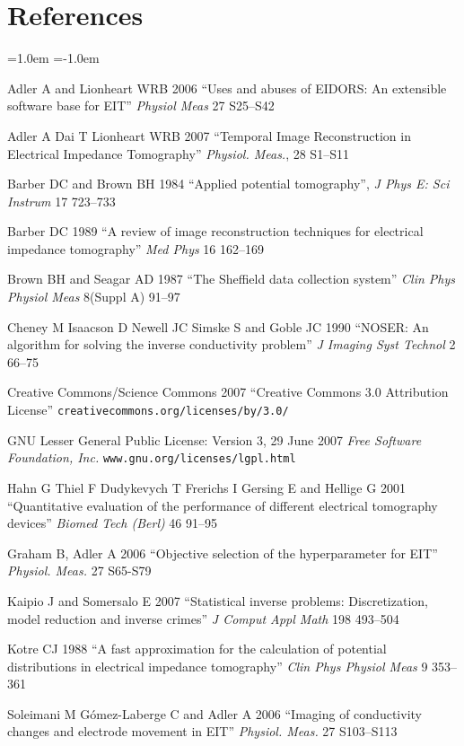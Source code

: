 \documentclass[letterpaper,twocolumn,11pt]{article}
\begin{document}
\section*{References}

\begin{list}{}
  {\leftmargin=1.0em \itemindent=-1.0em
    \baselineskip
    \baselineskip}
\item[]
Adler A and Lionheart WRB 2006
``Uses and abuses of EIDORS: An extensible software base for EIT''
{\em Physiol Meas}
27 S25--S42

\item[]
Adler A Dai T Lionheart WRB 2007
``Temporal Image Reconstruction in Electrical Impedance Tomography''
{\em Physiol. Meas.}, 28 S1--S11


\item[]
Barber DC and Brown BH 1984
``Applied potential tomography'', 
{\em J Phys E: Sci Instrum}
 17 723--733

\item[]
Barber DC 1989
``A review of image reconstruction techniques for electrical
 impedance tomography''
{\em Med Phys}
16 162--169

\item[]
Brown BH and Seagar AD 1987 
``The Sheffield data collection system''
{\em Clin Phys Physiol Meas}
 8(Suppl A) 91--97

\item[]
Cheney M Isaacson D Newell JC Simske S and Goble JC 1990
``NOSER: An algorithm for solving the inverse conductivity problem''
{\em J Imaging Syst Technol} 2 66--75

\item[]
Creative Commons/Science Commons 2007
``Creative Commons 3.0 Attribution License''
\verb+creativecommons.org/licenses/by/3.0/+

\item[]
GNU Lesser General Public License: Version 3, 29 June 2007
{\em Free Software Foundation, Inc.}
\verb+www.gnu.org/licenses/lgpl.html+

\item[]
Hahn G Thiel F Dudykevych T Frerichs I Gersing E
and Hellige G 2001
``Quantitative evaluation of the performance of
different electrical tomography devices''
{\em  Biomed Tech (Berl)}
46 91--95

\item[]
Graham B, Adler A 2006
``Objective selection of the hyperparameter for EIT''
{\em Physiol. Meas.}
27 S65-S79

\item[]
Kaipio J and Somersalo E 2007
``Statistical inverse problems: Discretization, model reduction and inverse crimes''
{\em J Comput Appl Math}
198 493--504

\item[]
Kotre CJ 1988
``A fast approximation for the calculation of potential distributions in electrical impedance tomography''
{\em Clin Phys Physiol Meas}
9 353--361

\item[]
Soleimani M G\'omez-Laberge C and Adler A 2006
``Imaging of conductivity changes and electrode movement in EIT''
{\em Physiol. Meas.} 27 S103--S113

\end{list}
\end{document}
